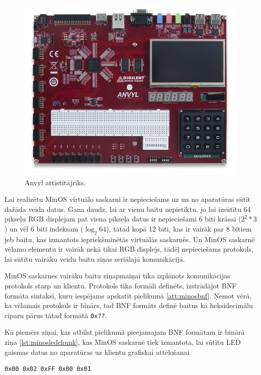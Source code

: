 \begin{figure}[H]
    \includegraphics[width=0.7\linewidth]{assets/anvyl.png}
    \centering
    \caption{Anvyl attīstītājrīks.}
    \label{fig:anvyl}
\end{figure}

Lai realizētu MinOS virtuālo saskarni ir nepieciešams uz un no aparatūras sūtīt
dažāda veida datus. Gana daudz, lai ar vienu baitu nepietiktu, jo lai izsūtītu
64 pikseļu RGB displejam pat viena pikseļa datus ir nepieciešami 6 biti krāsai
(\(2^2 * 3\)) un vēl 6 biti indeksam (\(\log_{2}64\)), tātad kopā 12 biti, kas
ir vairāk par 8 bitiem jeb baitu, kas izmantots iepriekšminētās virtuālās
saskarnēs. Un MinOS saskarnē vēlamo elementu ir vairāk nekā tikai RGB displejs,
tādēļ nepieciešams protokols, lai sūtītu vairāku veidu baitu ziņas seriālajā
komunikācijā.

MinOS saskarnes vairāku baitu ziņapmaiņai tika izplānots komunikācijas protokols
starp  un klientu. Protokols tika formāli definēts,
izstrādājot BNF formāta sintaksi, kuru iespējams apskatīt pielikumā
\ref{att:minosbnf}. Ņemot vērā, ka vēlamais protokols ir binārs, tad BNF formāts
definē baitus kā heksidecimālu ciparu pārus tātad formātā \lstinline!0x??!.

Kā piemērs ziņai, kas atbilst pielikumā pieejamajam BNF formātam ir binārā ziņa
\ref{lst:minosledchunk}, kas MinOS saskarnē tiek izmantota, lai sūtītu LED
gaismas datus no aparatūras uz klientu grafiskai attēlošanai.

\begin{lstlisting}[caption={MinOS LED gaismu pakete},label={lst:minosledchunk},captionpos=b]
    0x00 0x02 0xFF 0x00 0x01 
\end{lstlisting}

